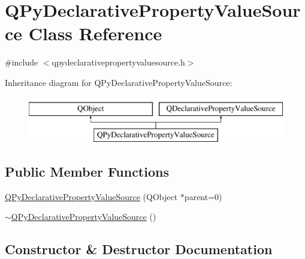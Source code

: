 \hypertarget{classQPyDeclarativePropertyValueSource}{}\section{Q\+Py\+Declarative\+Property\+Value\+Source Class Reference}
\label{classQPyDeclarativePropertyValueSource}


{\ttfamily \#include $<$qpydeclarativepropertyvaluesource.\+h$>$}

Inheritance diagram for Q\+Py\+Declarative\+Property\+Value\+Source\+:\begin{figure}[H]
\begin{center}
\leavevmode
\includegraphics[height=2.000000cm]{classQPyDeclarativePropertyValueSource}
\end{center}
\end{figure}
\subsection*{Public Member Functions}
\begin{DoxyCompactItemize}
\item 
\hyperlink{classQPyDeclarativePropertyValueSource_a3f8466bf4d5b40851134557c1b20a36d}{Q\+Py\+Declarative\+Property\+Value\+Source} (Q\+Object $\ast$parent=0)
\item 
\hyperlink{classQPyDeclarativePropertyValueSource_abb0fe6103a7ab70f395ca1283b77d16f}{$\sim$\+Q\+Py\+Declarative\+Property\+Value\+Source} ()
\end{DoxyCompactItemize}


\subsection{Constructor \& Destructor Documentation}
\hypertarget{classQPyDeclarativePropertyValueSource_a3f8466bf4d5b40851134557c1b20a36d}{}
